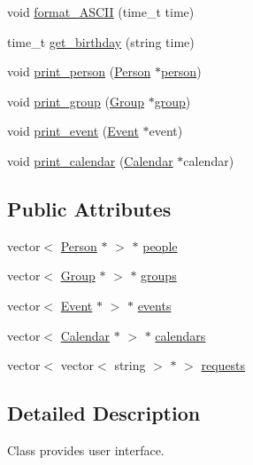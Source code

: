\begin{DoxyCompactItemize}
\item 
void \hyperlink{classUserInterface_a41c109a7e042b44dc98a1250681fc684}{format\_\-ASCII} (time\_\-t time)
\item 
time\_\-t \hyperlink{classUserInterface_a313636d15fc03a167163b56f0223cab9}{get\_\-birthday} (string time)
\item 
void \hyperlink{classUserInterface_a45a7ad6cca95218631d8c6fbe49362e2}{print\_\-person} (\hyperlink{classPerson}{Person} $\ast$\hyperlink{group__content_8h_ab8664e6fd42f01eeaad084b5e20eb54e}{person})
\item 
void \hyperlink{classUserInterface_a31424519b61f71584a4a5196c6632beb}{print\_\-group} (\hyperlink{classGroup}{Group} $\ast$\hyperlink{group__content_8h_a27517aa1480ab2d9bfe5d62e693b33eb}{group})
\item 
void \hyperlink{classUserInterface_aca628f5a276b39ff4346e2150b419590}{print\_\-event} (\hyperlink{classEvent}{Event} $\ast$event)
\item 
void \hyperlink{classUserInterface_aca95eaf06d053b4ac267e94ccb84e501}{print\_\-calendar} (\hyperlink{classCalendar}{Calendar} $\ast$calendar)
\end{DoxyCompactItemize}
\subsection*{Public Attributes}
\begin{DoxyCompactItemize}
\item 
vector$<$ \hyperlink{classPerson}{Person} $\ast$ $>$ $\ast$ \hyperlink{classUserInterface_a3d0914e9d2ba661bc3691397c695287e}{people}
\item 
vector$<$ \hyperlink{classGroup}{Group} $\ast$ $>$ $\ast$ \hyperlink{classUserInterface_a12676e629660c43c63eb5b01c5c19bc3}{groups}
\item 
vector$<$ \hyperlink{classEvent}{Event} $\ast$ $>$ $\ast$ \hyperlink{classUserInterface_ae3370dc0d02c19b4b1cc7c47221c2bfa}{events}
\item 
vector$<$ \hyperlink{classCalendar}{Calendar} $\ast$ $>$ $\ast$ \hyperlink{classUserInterface_abd1f3233d3e666415f6cdf8458b50faa}{calendars}
\item 
vector$<$ vector$<$ string $>$ $\ast$ $>$ \hyperlink{classUserInterface_af1cb3bd8de564e4610d863937986d60e}{requests}
\end{DoxyCompactItemize}


\subsection{Detailed Description}
Class provides user interface. 

